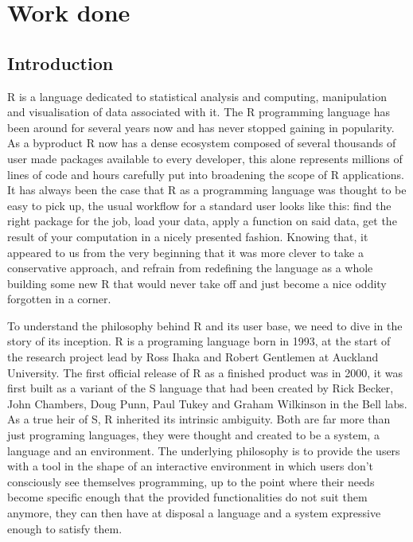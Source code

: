 
\chapter{Work done}

\section{Introduction}

R is a language dedicated to statistical analysis and computing, manipulation and visualisation of data associated with it. The R programming language has been around for several years now and has never stopped gaining in popularity. As a byproduct R now has a dense ecosystem composed of several thousands of user made packages available to every developer, this alone represents millions of lines of code and hours carefully put into broadening the scope of R applications. It has always been the case that R as a programming language was thought to be easy to pick up, the usual workflow for a standard user looks like this: find the right package for the job, load your data, apply a function on said data, get the result of your computation in a nicely presented fashion.
Knowing that, it appeared to us from the very beginning that it was more clever to take a conservative approach, and refrain from redefining the language as a whole building some new R that would never take off and just become a nice oddity forgotten in a corner.


To understand the philosophy behind R and its user base, we need to dive in the story of its inception. R is a programing language born in 1993, at the start of the research project lead by Ross Ihaka and Robert Gentlemen at Auckland University. The first official release of R as a finished product was in 2000, it was first built as a variant of the S language that had been created by Rick Becker, John Chambers, Doug Punn, Paul Tukey and Graham Wilkinson in the Bell labs.
As a true heir of S, R inherited its intrinsic ambiguity. Both are far more than just programing languages, they were thought and created to be a system, a language and an environment. The underlying philosophy is to provide the users with a tool in the shape of an interactive environment in which users  don't consciously see themselves programming, up to the point where their needs become specific enough that the provided functionalities do not suit them anymore, they can then have at disposal a language and a system expressive enough to satisfy them.

